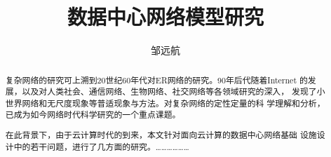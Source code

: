 \documentclass[master]{njuthesis}
\title{数据中心网络模型研究}
\author{邹远航}
\institute{南京大学}
\begin{document}

\makenlctitle
\maketitle
\makeenglishtitle


\frontmatter

\begin{abstract}
复杂网络的研究可上溯到20世纪60年代对ER网络的研究。90年后代随着Internet
的发展，以及对人类社会、通信网络、生物网络、社交网络等各领域研究的深入，
发现了小世界网络和无尺度现象等普适现象与方法。对复杂网络的定性定量的科
学理解和分析，已成为如今网络时代科学研究的一个重点课题。

在此背景下，由于云计算时代的到来，本文针对面向云计算的数据中心网络基础
设施设计中的若干问题，进行了几方面的研究。………………
\end{abstract}

\begin{englishabstract}
\blindtext
\end{englishabstract}
\end{document}
